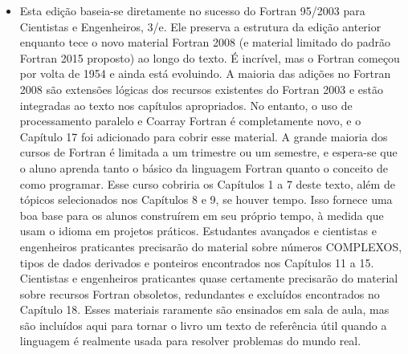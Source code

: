 \begin{frame}
\begin{itemize}
  \item Esta edição baseia-se diretamente no sucesso do Fortran 95/2003 para Cientistas e Engenheiros, 3/e. Ele preserva a estrutura da edição anterior enquanto tece o novo material Fortran 2008 (e material limitado do padrão Fortran 2015 proposto) ao longo do texto. É incrível, mas o Fortran começou por volta de 1954 e ainda está evoluindo. A maioria das adições no Fortran 2008 são extensões lógicas dos recursos existentes do Fortran 2003 e estão integradas ao texto nos capítulos apropriados. No entanto, o uso de processamento paralelo e Coarray Fortran é completamente novo, e o Capítulo 17 foi adicionado para cobrir esse material. A grande maioria dos cursos de Fortran é limitada a um trimestre ou um semestre, e espera-se que o aluno aprenda tanto o básico da linguagem Fortran quanto o conceito de como programar. Esse curso cobriria os Capítulos 1 a 7 deste texto, além de tópicos selecionados nos Capítulos 8 e 9, se houver tempo. Isso fornece uma boa base para os alunos construírem em seu próprio tempo, à medida que usam o idioma em projetos práticos. Estudantes avançados e cientistas e engenheiros praticantes precisarão do material sobre números COMPLEXOS, tipos de dados derivados e ponteiros encontrados nos Capítulos 11 a 15. Cientistas e engenheiros praticantes quase certamente precisarão do material sobre recursos Fortran obsoletos, redundantes e excluídos encontrados no Capítulo 18. Esses materiais raramente são ensinados em sala de aula, mas são incluídos aqui para tornar o livro um texto de referência útil quando a linguagem é realmente usada para resolver problemas do mundo real.
\end{itemize}
\end{frame}